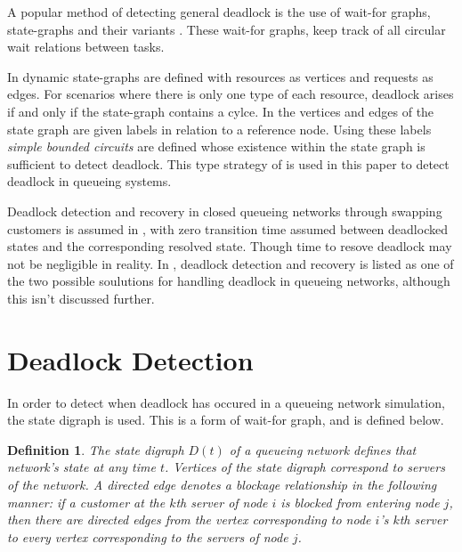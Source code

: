 \documentclass{article}
\newtheorem{definition}{Definition}
\begin{document}
A popular method of detecting general deadlock is the use of wait-for graphs, state-graphs and their variants \cite{cheng90, elmagarmid86, coffmanelphick71, choetal95}.
These wait-for graphs, keep track of all circular wait relations between tasks.

In \cite{coffmanelphick71} dynamic state-graphs are defined with resources as vertices and requests as edges.
For scenarios where there is only one type of each resource, deadlock arises if and only if the state-graph contains a cylce.
In \cite{choetal95} the vertices and edges of the state graph are given labels in relation to a reference node.
Using these labels \textit{simple bounded circuits} are defined whose existence within the state graph is sufficient to detect deadlock.
This type strategy of is used in this paper to detect deadlock in queueing systems.

Deadlock detection and recovery in closed queueing networks through swapping customers is assumed in \cite{perrosetal88}, with zero transition time assumed between deadlocked states and the corresponding resolved state. Though time to resove deadlock may not be negligible in reality.
In \cite{akyildiz89}, deadlock detection and recovery is listed as one of the two possible soulutions for handling deadlock in queueing networks, although this isn't discussed further.




















\section{Deadlock Detection}\label{sec:detectingdeadlock}

In order to detect when deadlock has occured in a queueing network simulation, the state digraph is used.
This is a form of wait-for graph, and is defined below.\\

\begin{definition}
The state digraph $D(t)$ of a queueing network defines that network's state at any time $t$.
Vertices of the state digraph correspond to servers of the network.
A directed edge denotes a blockage relationship in the following manner: if a customer at the $k$th server of node $i$ is blocked from entering node $j$, then there are directed edges from the vertex corresponding to node $i$'s $k$th server to every vertex corresponding to the servers of node $j$.
\end{definition}
\end{document}
